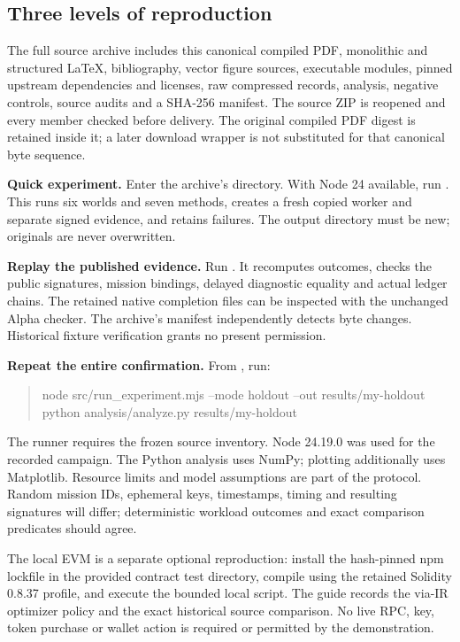 \subsection{Three levels of reproduction}
The full source archive includes this canonical compiled PDF, monolithic and structured LaTeX, bibliography, vector figure sources, executable modules, pinned upstream dependencies and licenses, raw compressed records, analysis, negative controls, source audits and a SHA-256 manifest. The source ZIP is reopened and every member checked before delivery. The original compiled PDF digest is retained inside it; a later download wrapper is not substituted for that canonical byte sequence.

\textbf{Quick experiment.} Enter the archive's  directory. With Node 24 available, run . This runs six worlds and seven methods, creates a fresh copied worker and separate signed evidence, and retains failures. The output directory must be new; originals are never overwritten.

\textbf{Replay the published evidence.} Run . It recomputes outcomes, checks the public signatures, mission bindings, delayed diagnostic equality and actual ledger chains. The retained native completion files can be inspected with the unchanged Alpha checker. The archive's manifest independently detects byte changes. Historical fixture verification grants no present permission.

\textbf{Repeat the entire confirmation.} From , run:
\begin{quote}\small\ttfamily
node src/run\_experiment.mjs --mode holdout --out results/my-holdout\\
python analysis/analyze.py results/my-holdout
\end{quote}
The runner requires the frozen source inventory. Node 24.19.0 was used for the recorded campaign. The Python analysis uses NumPy; plotting additionally uses Matplotlib. Resource limits and model assumptions are part of the protocol. Random mission IDs, ephemeral keys, timestamps, timing and resulting signatures will differ; deterministic workload outcomes and exact comparison predicates should agree.

The local EVM is a separate optional reproduction: install the hash-pinned npm lockfile in the provided contract test directory, compile using the retained Solidity 0.8.37 profile, and execute the bounded local script. The guide records the via-IR optimizer policy and the exact historical source comparison. No live RPC, key, token purchase or wallet action is required or permitted by the demonstration.

